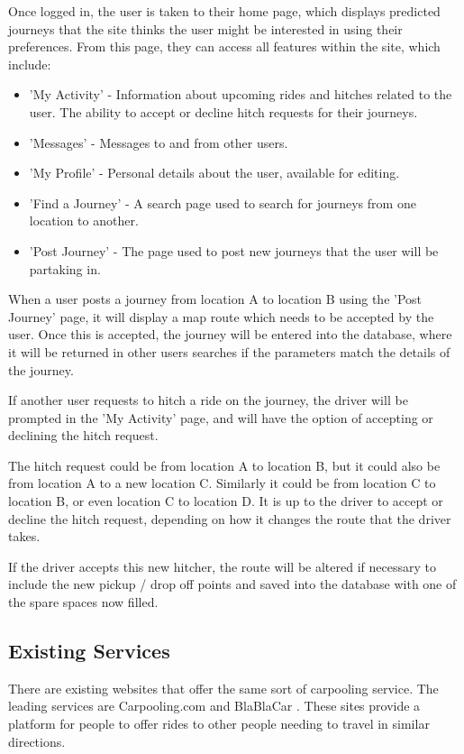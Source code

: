 	Once logged in, the user is taken to their home page, which displays predicted journeys that the site thinks the user might be interested in using their preferences. From this page, they can access all features within the site, which include:
	\begin{itemize}
		\item 'My Activity' - Information about upcoming rides and hitches related to the user. The ability to accept or decline hitch requests for their journeys.
		\item 'Messages' - Messages to and from other users.
		\item 'My Profile' - Personal details about the user, available for editing.
		\item 'Find a Journey' - A search page used to search for journeys from one location to another.
		\item 'Post Journey' - The page used to post new journeys that the user will be partaking in.		
	\end{itemize}
	
	When a user posts a journey from location A to location B using the 'Post Journey' page, it will display a map route which needs to be accepted by the user. Once this is accepted, the journey will be entered into the database, where it will be returned in other users searches if the parameters match the details of the journey.
	
	If another user requests to hitch a ride on the journey, the driver will be prompted in the 'My Activity' page, and will have the option of accepting or declining the hitch request. 
	
	The hitch request could be from location A to location B, but it could also be from location A to a new location C. Similarly it could be from location C to location B, or even location C to location D. It is up to the driver to accept or decline the hitch request, depending on how it changes the route that the driver takes.
	
	If the driver accepts this new hitcher, the route will be altered if necessary to include the new pickup / drop off points and saved into the database with one of the spare spaces now filled. 
\subsection{Existing Services}
	There are existing websites that offer the same sort of carpooling service. The leading services are Carpooling.com \cite{carpooling_com} and BlaBlaCar \cite{blabla}. These sites provide a platform for people to offer rides to other people needing to travel in similar directions.
	


